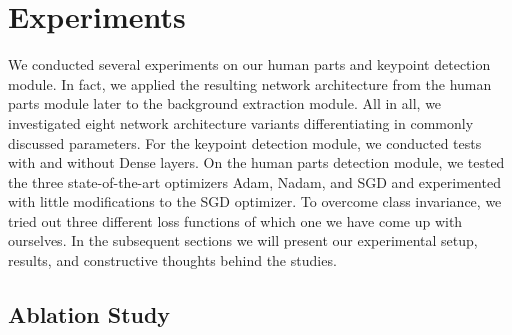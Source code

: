 

\chapter{Experiments} %

\label{experiments} %
We conducted several experiments on our human parts and keypoint detection module.
In fact, we applied the resulting network architecture from the human parts module later to the background extraction module.
All in all, we investigated eight network architecture variants differentiating in commonly discussed parameters.
For the keypoint detection module, we conducted tests with and without Dense layers.
On the human parts detection module, we tested the three state-of-the-art optimizers Adam, Nadam, and SGD and experimented with little
modifications to the SGD optimizer.
To overcome class invariance, we tried out three different loss functions of which one we have come up with
ourselves.
In the subsequent sections we will present our experimental setup, results, and constructive thoughts behind the studies.



\section{Ablation Study}




